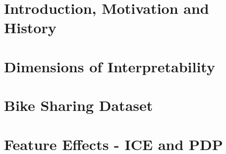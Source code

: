 \documentclass[11pt,compress,t,notes=noshow, aspectratio=169, xcolor=table]{beamer}
\begin{document}


\section{Introduction, Motivation and History}




\section{Dimensions of Interpretability}




%

% 

\section{Bike Sharing Dataset}


\section{Feature Effects - ICE and PDP}



\end{document}
